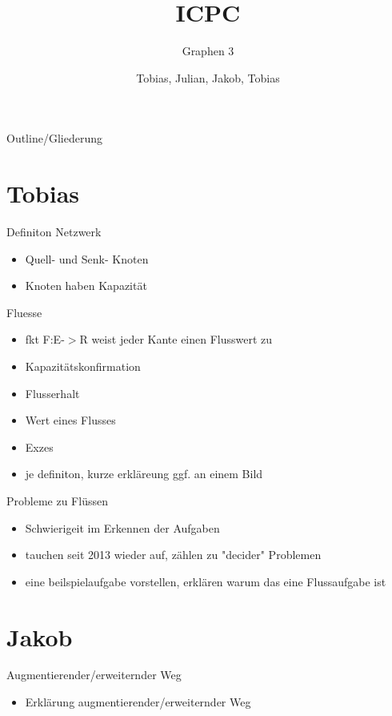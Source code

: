 \documentclass[18pt]{beamer}
\title[Short title]{ICPC}
\subtitle{Graphen 3}
\author{Tobias, Julian, Jakob, Tobias}
\institute{ITI Wagner, IPD Tichy}
\begin{document}

\begin{frame}
\titlepage
\end{frame}

\begin{frame}{Outline/Gliederung}
\tableofcontents
\end{frame}

\section{Tobias}
\begin{frame}{Definiton Netzwerk}
\begin{itemize}
\item Quell- und  Senk- Knoten
\item Knoten haben Kapazit\"at
\end{itemize}
\end{frame}

\begin{frame}{Fluesse}
	\begin{itemize}
	\item fkt F:E-$>$R weist jeder Kante einen Flusswert zu
	\item Kapazit\"atskonfirmation
	\item Flusserhalt
	\item Wert eines Flusses
	\item Exzes
	\item je definiton, kurze erkl\"areung ggf. an einem Bild
	\end{itemize}
\end{frame}

\begin{frame}{Probleme zu Fl\"ussen}
	\begin{itemize}
		\item Schwierigeit im Erkennen der Aufgaben
		\item tauchen seit 2013 wieder auf, zählen zu "decider" Problemen
		\item eine beilspielaufgabe vorstellen, erkl\"aren warum das eine Flussaufgabe ist
	\end{itemize}
\end{frame}

\section{Jakob}
\begin{frame}{Augmentierender/erweiternder Weg}
	\begin{itemize}
		\item Erkl\"arung augmentierender/erweiternder Weg
	\end{itemize}
\end{frame}
\end{document}
